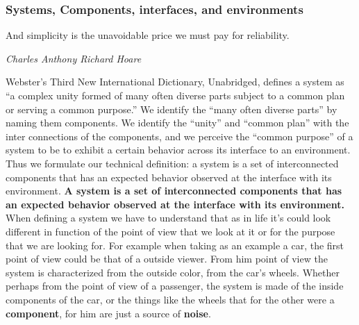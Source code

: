 \documentclass{article}
\begin{document}
  \subsubsection{Systems, Components, interfaces, and environments}
    \epigraph{And simplicity is the unavoidable price we must pay for reliability.}{\textit{Charles Anthony Richard Hoare}}
    Webster’s Third New International Dictionary, Unabridged, defines a system as “a complex 
    unity formed of many often diverse parts subject to a common plan or serving a common purpose.”
    We identify the “many often diverse parts” 
    by naming them components. We identify the “unity” and “common plan” with the inter
    connections of the components, and we perceive the “common purpose” of a system to 
    be to exhibit a certain behavior across its interface to an environment. Thus we formulate 
    our technical definition: a system is a set of interconnected components that 
    has an expected behavior observed at the interface with its environment. \textbf{A system is a set of interconnected components that 
    has an expected behavior observed at the interface with its environment.} 
    When defining a system we have to understand that as in life it's could look different in function of the point of view 
    that we look at it or for the purpose that we are looking for. For example when taking as an example a car, the first point of view could be that of a outside
    viewer. From him point of view the system is characterized from the outside color, from the car's wheels. Whether perhaps
    from the point of view of a passenger, the system is made of the inside components of the car, or the things like the wheels 
    that for the other were a \textbf{component}, for him are just a source of \textbf{noise}. 
\end{document}
